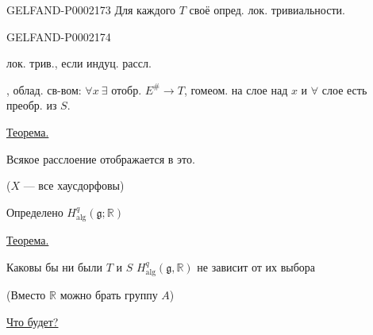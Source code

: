 \begin{GelfandAdjacentEvidence}{GELFAND-P000217}{3}
Для каждого $T$ своё опред. лок. тривиальности.







\end{GelfandAdjacentEvidence}
\begin{GelfandAdjacentEvidence}{GELFAND-P000217}{4}

лок. трив., если индуц. рассл.







, облад. св-вом:
$\forall x\ \exists$ отобр. $E^{\#}\longrightarrow T$, гомеом. на слое над $x$ и
$\forall$ слое есть преобр. из $S$.




\end{GelfandAdjacentEvidence}
\underline{Теорема.}



Всякое расслоение отображается в это.



($X$ --- все хаусдорфовы)



Определено $H^q_{\mathrm{alg}}(\mathfrak g;\mathbb R)$



\underline{Теорема.}



Каковы бы ни были $T$ и $S$ $H^q_{\mathrm{alg}}(\mathfrak g,\mathbb R)$
не зависит от их выбора



(Вместо $\mathbb R$ можно брать группу $A$)



\underline{Что будет?}



